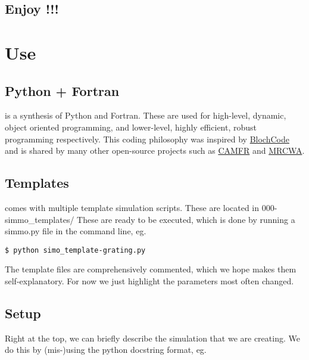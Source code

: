 \documentclass[11pt,a4paper,twoside]{report}
\begin{document}
\section*{Enjoy \CodeName!!!}









\chapter{Use}
\label{Use}


\section{Python + Fortran}

\CodeName is a synthesis of Python and Fortran. These are used for high-level, dynamic, object oriented programming, and lower-level, highly efficient, robust programming respectively. This coding philosophy was inspired by \href{https://launchpad.net/blochcode}{BlochCode} and is shared by many other open-source projects such as \href{http://camfr.sourceforge.net/index.html}{CAMFR} and \href{http://mrcwa.sourceforge.net/}{MRCWA}. 










\section{Templates}

\CodeName comes with multiple template simulation scripts. These are located in 000-simmo\_templates/
These are ready to be executed, which is done by running a simmo.py file in the command line, eg.

\begin{lstlisting}
$ python simo_template-grating.py
\end{lstlisting}

The template files are comprehensively commented, which we hope makes them self-explanatory. For now we just highlight the parameters most often changed.






\section{Setup}
Right at the top, we can briefly describe the simulation that we are creating.
We do this by (mis-)using the python docstring format, eg.
\end{document}
